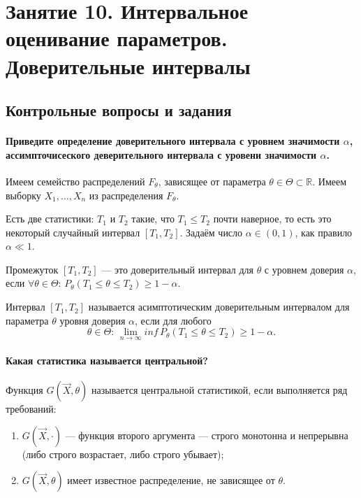 \chapter*{Занятие 10. Интервальное оценивание параметров. Доверительные интервалы}

\section*{Контрольные вопросы и задания}

\subsubsection*{Приведите определение доверительного интервала с уровнем значимости $ \alpha $,
                ассимпточисеского деверительного интервала с уровени значимости $ \alpha $.}

Имеем семейство распределений $F_{ \theta }$,
зависящее от параметра $ \theta \in \Theta \subset \mathbb{R}$.
Имеем выборку $X_1, \dotsc, X_n$ из распределения $F_{ \theta }$.

Есть две статистики: $T_1$ и $T_2$ такие, что $T_1 \leq T_2$ почти наверное,
то есть это некоторый случайный интервал $ \left[ T_1, T_2 \right] $.
Задаём число $ \alpha \in \left( 0, 1 \right) $, как правило $ \alpha \ll 1$.

Промежуток $ \left[ T_1, T_2 \right] $ ---
это доверительный интервал для $ \theta $ с уровнем доверия $ \alpha $,
если
$ \forall \theta \in \Theta: \,
  P_{ \theta } \left( T_1 \leq \theta \leq T_2 \right) \geq 1 - \alpha $.

Интервал $ \left[ T_1, T_2 \right] $
называется асимптотическим доверительным интервалом для параметра $ \theta $ уровня доверия
$ \alpha $,
если для любого
$$ \theta \in \Theta: \,
  \lim \limits_{n \to \infty } inf \, P_{ \theta } \left( T_1 \leq \theta \leq T_2 \right) \geq
  1 - \alpha.$$

\subsubsection*{Какая статистика называется центральной?}

Функция $G \left( \vec{X}, \theta \right) $ называется центральной статистикой,
если выполняется ряд требований:
\begin{enumerate}
  \item $G \left( \vec{X}, \cdot \right) $ --- функция второго аргумента ---
  строго монотонна и непрерывна (либо строго возрастает, либо строго убывает);
  \item $G \left( \vec{X}, \theta \right) $ имеет известное распределение,
  не зависящее от $ \theta $.
\end{enumerate}

